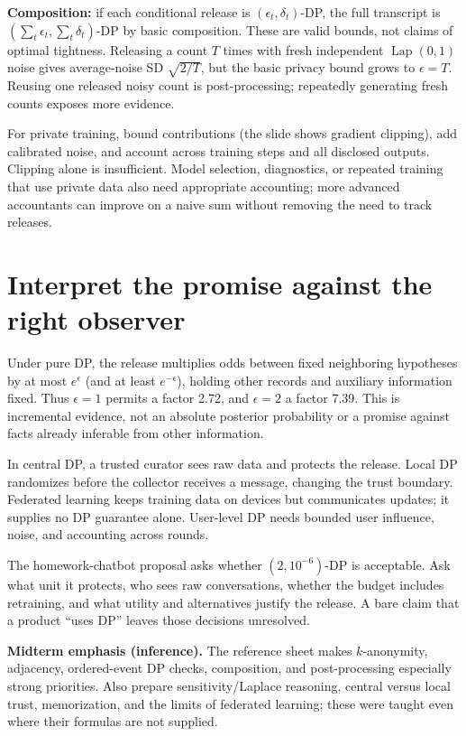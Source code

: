 \documentclass[11pt,letterpaper]{article}
\begin{document}
\textbf{Composition:} if each conditional release is
$(\epsilon_t,\delta_t)$-DP, the full transcript is
$(\sum_t\epsilon_t,\sum_t\delta_t)$-DP by basic composition. These are valid
bounds, not claims of optimal tightness. Releasing a count $T$ times with fresh
independent $\operatorname{Lap}(0,1)$ noise gives average-noise SD $\sqrt{2/T}$,
but the basic privacy bound grows to $\epsilon=T$. Reusing one released noisy
count is post-processing; repeatedly generating fresh counts exposes more evidence.

For private training, bound contributions (the slide shows gradient clipping),
add calibrated noise, and account across training steps and all disclosed outputs.
Clipping alone is insufficient. Model selection, diagnostics, or repeated training
that use private data also need appropriate accounting; more advanced accountants
can improve on a naive sum without removing the need to track releases.

\section*{Interpret the promise against the right observer}
Under pure DP, the release multiplies odds between fixed neighboring hypotheses
by at most $e^\epsilon$ (and at least $e^{-\epsilon}$), holding other records and
auxiliary information fixed. Thus $\epsilon=1$ permits a factor 2.72, and
$\epsilon=2$ a factor 7.39. This is incremental evidence, not an absolute posterior
probability or a promise against facts already inferable from other information.

In central DP, a trusted curator sees raw data and protects the release. Local DP
randomizes before the collector receives a message, changing the trust boundary.
Federated learning keeps training data on devices but communicates updates; it
supplies no DP guarantee alone. User-level DP needs bounded user influence,
noise, and accounting across rounds.

The homework-chatbot proposal asks whether $(2,10^{-6})$-DP is acceptable. Ask
what unit it protects, who sees raw conversations, whether the budget includes
retraining, and what utility and alternatives justify the release. A bare claim
that a product ``uses DP'' leaves those decisions unresolved.

\textbf{Midterm emphasis (inference).} The reference sheet makes $k$-anonymity,
adjacency, ordered-event DP checks, composition, and post-processing especially
strong priorities. Also prepare sensitivity/Laplace reasoning, central versus local
trust, memorization, and the limits of federated learning; these were taught even
where their formulas are not supplied.

\end{document}
